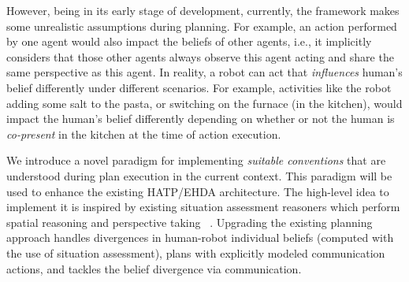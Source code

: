 \documentclass[letterpaper]{article} %
\begin{document}
However, being in its early stage of development, currently, the framework makes some unrealistic assumptions during planning. For example, an action performed by one agent would also impact the beliefs of other agents, i.e., it implicitly considers that those other agents always observe this agent acting and share the same perspective as this agent. 
In reality, a robot can act that \textit{influences} human's belief differently under different scenarios. For example, activities like the robot adding some salt to the pasta, or switching on the furnace (in the kitchen), would impact the human's belief differently depending on whether or not the human is \textit{co-present} in the kitchen at the time of action execution.   



We introduce a novel paradigm for implementing \textit{suitable conventions} that are understood during plan execution in the current context. This paradigm will be used to enhance the existing HATP/EHDA architecture. 
The high-level idea to implement it is inspired by existing situation assessment reasoners which perform spatial reasoning and perspective taking ~\cite{flavell1992perspectives,trafton2005enabling,johnson2005perceptual,Sisbot2011SituationAF,warnier-2012,lemaignan-2017}. 
Upgrading the existing planning approach 
handles divergences in human-robot individual beliefs (computed with the use of situation assessment), 
plans with explicitly modeled communication actions, and tackles the belief divergence 
via communication.
\end{document}
